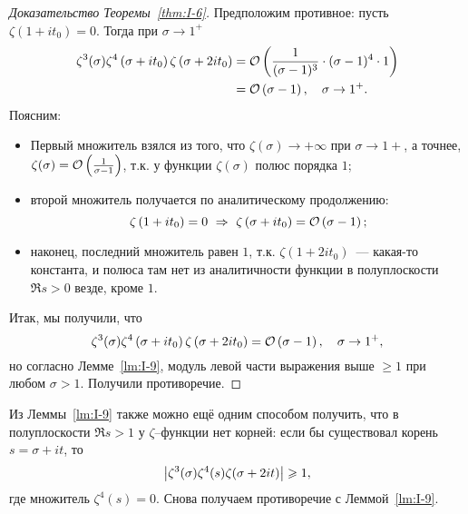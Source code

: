 \begin{proof}[Доказательство Теоремы~\ref{thm:I-6}]
    Предположим противное: пусть $\zeta\left(1 + it_0 \right) = 0$. Тогда при $\sigma \to 1^+$
    \begin{align*}
        \zeta^3(\sigma) \zeta^4\left(\sigma + it_0 \right) \zeta\left(\sigma + 2it_0 \right) 
        &= \mathcal{O}\left( \frac{1}{(\sigma - 1)^3} \cdot (\sigma - 1)^4 \cdot 1 \right) \\
        &= \mathcal{O}\left( \sigma - 1 \right), \quad \sigma \to 1^+.
    \end{align*}
    Поясним:
    \begin{itemize}[label=$\circ$]
        \item
            Первый множитель взялся из того, что $\zeta(\sigma) \to +\infty$ при $\sigma \to 1+$, а точнее, $\zeta(\sigma) = \mathcal{O}\left( \frac{1}{\sigma-1} \right)$, т.к. у функции $\zeta(\sigma)$ полюс порядка $1$;
        \item
            второй множитель получается по аналитическому продолжению: 
            \[
                \zeta\left( 1 + it_0 \right) = 0 \ 
                \Rightarrow \ 
                \zeta\left( \sigma + it_0 \right) = \bigO{\sigma - 1};
            \]
        \item
            наконец, последний множитель равен $1$, т.к. $\zeta\left( 1 + 2it_0 \right)$ --- какая-то константа, и полюса там нет из аналитичности функции в полуплоскости $\Re{s} > 0$ везде, кроме $1$.
    \end{itemize}
    Итак, мы получили, что 
    \[
        \zeta^3(\sigma) \zeta^4\left(\sigma + it_0\right) \zeta\left(\sigma + 2it_0\right) = \mathcal{O}\left( \sigma - 1 \right), \quad \sigma \to 1^+,
    \]
    но согласно Лемме~\ref{lm:I-9}, модуль левой части выражения выше $\ge 1$ при любом $\sigma > 1$. Получили противоречие.
\end{proof}

\begin{remark}
    Из Леммы~\ref{lm:I-9} также можно ещё одним способом получить, что в полуплоскости $\Re{s} > 1$ у $\zeta$--функции нет корней: если бы существовал корень $s = \sigma + it$, то 
    \[
        \left| \zeta^3(\sigma) \zeta^4(s) \zeta(\sigma + 2it) \right| \geqslant 1,
    \]
    где множитель $\zeta^4(s) = 0$. Снова получаем противоречие с Леммой~\ref{lm:I-9}.
\end{remark}

